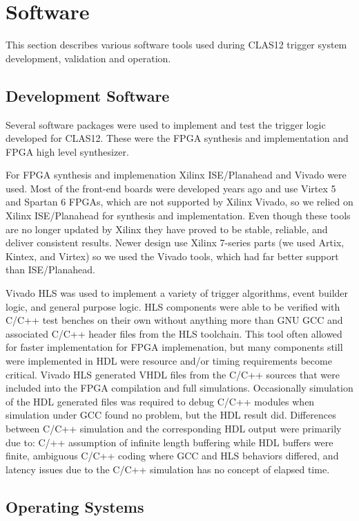 \section{Software}

This section describes various software tools used during CLAS12 trigger system development, validation and operation.

\subsection{Development Software}

Several software packages were used to implement and test the trigger logic developed for CLAS12. These were the FPGA synthesis and implementation and FPGA high level synthesizer.

For FPGA synthesis and implemenation Xilinx ISE/Planahead and Vivado were used. Most of the front-end boards were developed years ago and use Virtex 5 and Spartan 6 FPGAs, which are not supported by Xilinx Vivado, so we relied on Xilinx ISE/Planahead for synthesis and implementation. Even though these tools are no longer updated by Xilinx they have proved to be stable, reliable, and deliver consistent results. Newer design use Xilinx 7-series parts (we used Artix, Kintex, and Virtex) so we used the Vivado tools, which had far better support than ISE/Planahead.

Vivado HLS was used to implement a variety of trigger algorithms, event builder logic, and general purpose logic. HLS components were able to be verified with C/C++ test benches on their own without anything more than GNU GCC and associated C/C++ header files from the HLS toolchain. This tool often allowed for faster implementation for FPGA implemenation, but many components still were implemented in HDL were resource and/or timing requirements become critical. Vivado HLS generated VHDL files from the C/C++ sources that were included into the FPGA compilation and full simulations. Occasionally simulation of the HDL generated files was required to debug C/C++ modules when simulation under GCC found no problem, but the HDL result did. Differences between C/C++ simulation and the corresponding HDL output were primarily due to: C/++ assumption of infinite length buffering while HDL buffers were finite, ambiguous C/C++ coding where GCC and HLS behaviors differed, and latency issues due to the C/C++ simulation has no concept of elapsed time.

\subsection{Operating Systems}


